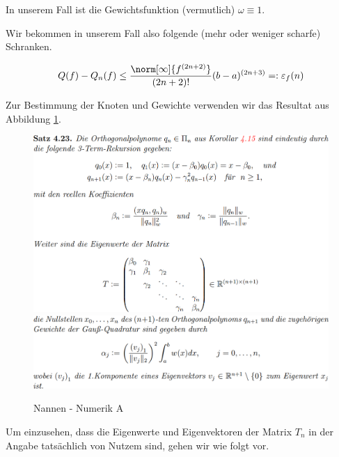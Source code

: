 \begin{solution}

In unserem Fall ist die Gewichtsfunktion (vermutlich) $\omega \equiv 1$.


Wir bekommen in unserem Fall also folgende (mehr oder weniger scharfe) Schranken.

\begin{align*}
  Q(f) - Q_n(f)
  \leq
  \frac
  {
    \norm[\infty]{f^{(2n+2)}}
  }{
    (2n + 2)!
  }
  (b - a)^{(2n+3)}
  =:
  \varepsilon_f(n)
\end{align*}

Zur Bestimmung der Knoten und Gewichte verwenden wir das Resultat aus Abbildung \ref{fig:NNAS4.23}.

\begin{figure}[h!]
  \begin{boxedin}
    \begin{center}
      \includegraphics[width = 0.75 \textwidth]{../../../Fundament-LaTeX/images/NumA/NumA - Satz 4.23.1.png} \\
      \vspace{0.5 cm}
      \includegraphics[width = 0.75 \textwidth]{../../../Fundament-LaTeX/images/NumA/NumA - Satz 4.23.2.png}
      \caption{Nannen - Numerik A}
      \label{fig:NNAS4.23}
    \end{center}
  \end{boxedin}
\end{figure}

Um einzusehen, dass die Eigenwerte und Eigenvektoren der Matrix $T_n$ in der Angabe tatsächlich von Nutzem sind, gehen wir wie folgt vor.


\end{solution}
